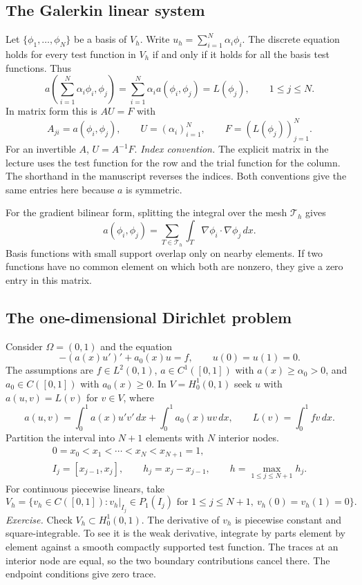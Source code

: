 \documentclass[11pt,a4paper]{article}
\begin{document}
\subsection{The Galerkin linear system}

Let \(\{\phi_1,\ldots,\phi_N\}\) be a basis of \(V_h\). Write
\(u_h=\sum_{i=1}^{N}\alpha_i\phi_i\). The discrete equation holds for
every test function in \(V_h\) if and only if it holds for all the basis
test functions. Thus
\[
 a\left(\sum_{i=1}^{N}\alpha_i\phi_i,\phi_j\right)
   =\sum_{i=1}^{N}\alpha_i a(\phi_i,\phi_j)=L(\phi_j),
 \qquad 1\le j\le N.
\]
In matrix form this is \(AU=F\) with
\[
 A_{ji}=a(\phi_i,\phi_j),\qquad
 U=(\alpha_i)_{i=1}^N,\qquad F=(L(\phi_j))_{j=1}^N .
\]
For an invertible \(A\), \(U=A^{-1}F\). \emph{Index convention.} The explicit
matrix in the lecture uses the test function for the row and the trial
function for the column. The shorthand in the manuscript reverses the
indices. Both conventions give the same entries here because \(a\) is symmetric.

For the gradient bilinear form, splitting the integral over the mesh
\(\mathcal T_h\) gives
\[
 a(\phi_i,\phi_j)=
 \sum_{T\in\mathcal T_h}\int_T\nabla\phi_i\cdot\nabla\phi_j\,dx.
\]
Basis functions with small support overlap only on nearby elements. If
two functions have no common element on which both are nonzero, they give
a zero entry in this matrix.

\subsection{The one-dimensional Dirichlet problem}

Consider \(\Omega=(0,1)\) and the equation
\[
 -(a(x)u')'+a_0(x)u=f,\qquad u(0)=u(1)=0.
\]
The assumptions are \(f\in L^2(0,1)\), \(a\in C^1([0,1])\) with
\(a(x)\ge\alpha_0>0\), and \(a_0\in C([0,1])\) with \(a_0(x)\ge0\).
In \(V=H_0^1(0,1)\) seek \(u\) with \(a(u,v)=L(v)\) for \(v\in V\), where
\[
 a(u,v)=\int_0^1a(x)u'v'\,dx+\int_0^1a_0(x)uv\,dx,\qquad
 L(v)=\int_0^1fv\,dx.
\]
Partition the interval into \(N+1\) elements with \(N\) interior nodes.
\[
 \begin{gathered}
 0=x_0<x_1<\cdots<x_N<x_{N+1}=1,\\
 I_j=[x_{j-1},x_j],\qquad h_j=x_j-x_{j-1},\qquad
 h=\max_{1\le j\le N+1}h_j .
 \end{gathered}
\]
For continuous piecewise linears, take
\[
 V_h=\bigl\{v_h\in C([0,1]):v_h|_{I_j}\in P_1(I_j)
 \text{ for }1\le j\le N+1,\ v_h(0)=v_h(1)=0\bigr\}.
\]
\emph{Exercise.} Check \(V_h\subset H_0^1(0,1)\). The derivative of
\(v_h\) is piecewise constant and square-integrable. To see it is the weak
derivative, integrate by parts element by element against a smooth compactly
supported test function. The traces at an interior node are equal, so the
two boundary contributions cancel there. The endpoint conditions give zero
trace.
\end{document}
